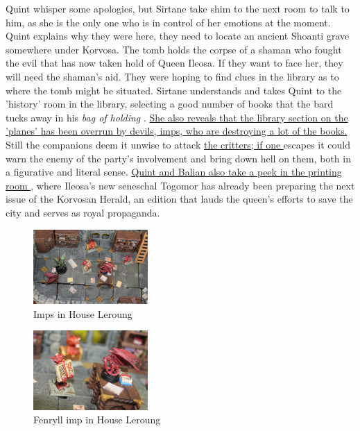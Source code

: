 Quint whisper some apologies, but Sirtane take shim to the next room to talk to him, as she is the only one who is in control of her emotions at the moment. Quint explains why they were here, they need to locate an ancient Shoanti grave somewhere under Korvosa. The tomb holds the corpse of a shaman who fought the evil that has now taken hold of Queen Ileosa. If they want to face her, they will need the shaman's aid. They were hoping to find clues in the library as to where the tomb might be situated. Sirtane understands and takes Quint to the 'history' room in the library, selecting a good number of books that the bard tucks away in his {\itshape bag of holding} . \hyperref[fig:Imps-in-House-Leroung-610269783]{ She also reveals that the library section on the 'planes' has been overrun by devils, imps, who are destroying a lot of the books. } Still the companions deem it unwise to attack \hyperref[fig:Fenryll-imp-in-House-Leroung-610270410]{ the critters; if one } escapes it could warn the enemy of the party's involvement and bring down hell on them, both in a figurative and literal sense. \hyperref[fig:Printing-press-in-House-Leroung-610271575]{ Quint and Balian also take a peek in the printing room } , where Ileosa's new seneschal Togomor has already been preparing the next issue of the Korvosan Herald, an edition that lauds the queen's efforts to save the city and serves as royal propaganda. \\

\begin{figure}[h]
	\centering
	\includegraphics[width=0.39\textwidth]{images/Imps-in-House-Leroung-610269783.jpg}
	\caption{Imps in House Leroung}
	\label{fig:Imps-in-House-Leroung-610269783}
\end{figure}

\begin{figure}[h]
	\centering
	\includegraphics[width=0.39\textwidth]{images/Fenryll-imp-in-House-Leroung-610270410.jpg}
	\caption{Fenryll imp in House Leroung}
	\label{fig:Fenryll-imp-in-House-Leroung-610270410}
\end{figure}

